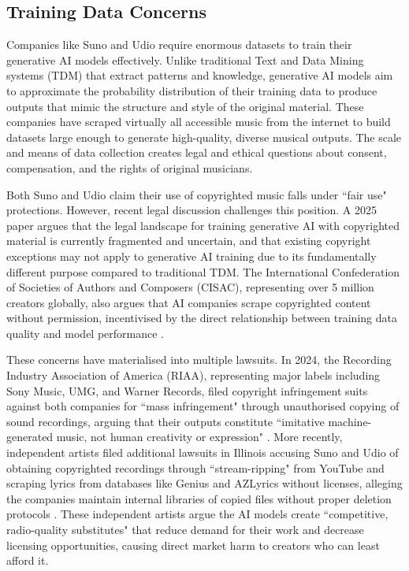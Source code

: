 \documentclass{article}
\begin{document}
\subsection{Training Data Concerns}
Companies like Suno and Udio require enormous datasets to train their generative AI models effectively. Unlike traditional Text and Data Mining systems (TDM) that extract patterns and knowledge, generative AI models aim to approximate the probability distribution of their training data to produce outputs that mimic the structure and style of the original material. These companies have scraped virtually all accessible music from the internet to build datasets large enough to generate high-quality, diverse musical outputs. The scale and means of data collection creates legal and ethical questions about consent, compensation, and the rights of original musicians.

Both Suno and Udio claim their use of copyrighted music falls under ``fair use" protections. However, recent legal discussion challenges this position. A 2025 paper \cite{dornis2025generative} argues that the legal landscape for training generative AI with copyrighted material is currently fragmented and uncertain, and that existing copyright exceptions may not apply to generative AI training due to its fundamentally different purpose compared to traditional TDM. The International Confederation of Societies of Authors and Composers (CISAC), representing over 5 million creators globally, also argues that AI companies scrape copyrighted content without permission, incentivised by the direct relationship between training data quality and model performance \cite{cisac2023statement}.

These concerns have materialised into multiple lawsuits. In 2024, the Recording Industry Association of America (RIAA), representing major labels including Sony Music, UMG, and Warner Records, filed copyright infringement suits against both companies for ``mass infringement" through unauthorised copying of sound recordings, arguing that their outputs constitute ``imitative machine-generated music, not human creativity or expression" \cite{connelly2024record}. More recently, independent artists filed additional lawsuits in Illinois accusing Suno and Udio of obtaining copyrighted recordings through ``stream-ripping" from YouTube and scraping lyrics from databases like Genius and AZLyrics without licenses, alleging the companies maintain internal libraries of copied files without proper deletion protocols \cite{dalugdug2024suno}. These independent artists argue the AI models create ``competitive, radio-quality substitutes" that reduce demand for their work and decrease licensing opportunities, causing direct market harm to creators who can least afford it.
\end{document}
